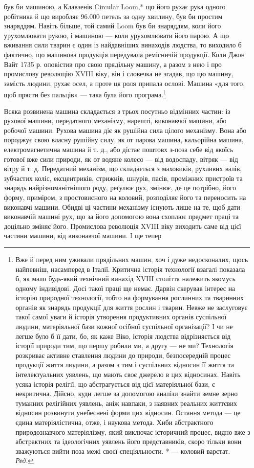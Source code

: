 був би машиною, а Клавзенів Circular Loom,* що його рухає
рука одного робітника й що виробляє 96.000 петель за одну хвилину,
був би простим знаряддям. Навіть більше, той самий Loom
був би знаряддям, коли його урухомлювати рукою, і машиною —
коли урухомлювати його парою. А що вживання сили тварин є
один із найдавніших винаходів людства, то виходило б фактично,
що машинова продукція передувала ремісничій продукції. Коли
Джон Вайт 1735 р. оповістив про свою прядільну машину, а
разом з нею і про промислову революцію XVIII віку, він і словечка
не згадав, що цю машину, замість людини, рухає осел, а
проте ця роля припала ослові. Машина «для того, щоб прясти
без пальців» — така була його програма.\footnote{
Вже й перед ним уживали прядільних машин, хоч і дуже недосконалих,
щось найпевніш, насамперед в Італії. Критична історія технології
взагалі показала б, як мало будь-який технічний винахід XVIII століття
належить якомусь одному індивідові. Досі такої праці ще немає. Дарвін
скерував інтерес на історію природної технології, тобто на формування
рослинних та тваринних органів як знарядь продукції для життя рослин і
тварин. Невже не заслуговує такої самої уваги й історія утворення
продуктивних органів суспільної людини, матеріяльної бази кожної
осібної суспільної організації? І чи не легше було б її дати, бо, як каже
Віко, історія людства відрізняється від історії природи тим, що першу
робили ми, а другу — не ми? Технологія розкриває активне ставлення
людини до природи, безпосередній процес продукції життя людини, а
разом з тим і суспільних відносин її життя та інтелектуальних уявлень,
що мають своє джерело в цих відносинах. Навіть усяка історія релігії,
що абстрагується від цієї матеріяльної бази, є некритична. Дійсно,
куди легше за допомогою аналізи знайти земне зерно туманних релігійних
уявлень, аніж навпаки, з наявних реальних життєвих відносин розвинути
унебеснені форми цих відносин. Остання метода — це єдина матеріялістична,
отже, і наукова метода. Хиби абстрактного природознавчого
матеріялізму, який виключає історичний процес, видно вже з абстрактних
та ідеологічних уявлень його представників, скоро тільки вони зважуються
вийти поза межі своєї спеціяльности.
* — коловий варстат. \emph{Ред.}
}

Всяка розвинена машина складається з трьох посутньо відмінних
частин: із рухової машини, передатного механізму, нарешті,
виконавчої машини, або робочої машини. Рухова машина
діє як рушійна сила цілого механізму. Вона або породжує свою
власну рушійну силу, як от парова машина, кальорійна машина,
електромагнетична машина й т. д., або дістає поштовх з-поза
себе від якоїсь готової вже сили природи, як от водяне колесо — від
водоспаду, вітряк — від вітру й т. д. Передатний механізм,
що складається з маховиків, рухливих валів, зубчастих коліс,
ексцентриків, стрижнів, шнурів, пасів, проміжних пристроїв
та знарядь найрізноманітнішого роду, реґулює рух, змінює, де
це потрібно, його форму, приміром, з простовисного на коловий,
розподіляє його та переносить на виконавчі машини. Обидві ці
частини механізму існують лише на те, щоб дати виконавчій машині
рух, що за його допомогою вона схоплює предмет праці та
доцільно зміняє його. Промислова революція XVIII віку виходить
саме від цієї частини машини, від виконавчої машини. І ще тепер